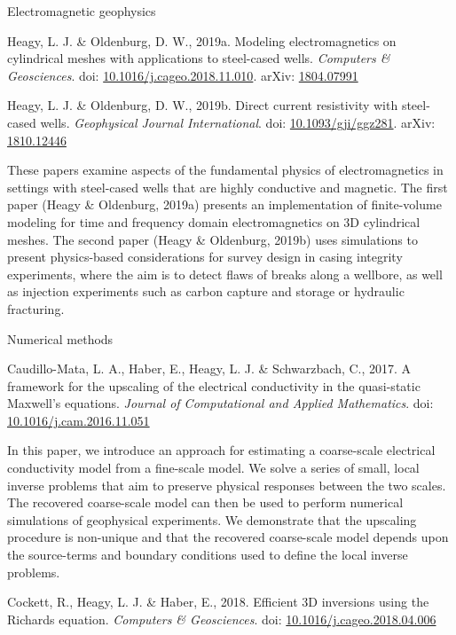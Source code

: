 \documentclass[a4paper, 11pt]{article}
\newcommand{\arxiv}[1]{arXiv: \href{https://arxiv.org/abs/#1}{#1}}
\newcommand{\doi}[1]{doi: \href{https://doi.org/#1}{#1}}
\newcommand{\subheading}[1]{
    \vspace{0.4cm}
    {\Large #1}\\
    \vspace{-0.2cm}
}
\begin{document}
\subheading{Electromagnetic geophysics}

\begin{myitemize}
    \item Heagy, L. J. \& Oldenburg, D. W., 2019a. Modeling electromagnetics on cylindrical meshes with applications to steel-cased wells. \emph{Computers \& Geosciences}. \doi{10.1016/j.cageo.2018.11.010}. \arxiv{1804.07991}
    \item Heagy, L. J. \& Oldenburg, D. W., 2019b. Direct current resistivity with steel-cased wells. \emph{Geophysical Journal International}. \doi{10.1093/gji/ggz281}. \arxiv{1810.12446}
\end{myitemize}

These papers examine aspects of the fundamental physics of electromagnetics in settings with steel-cased wells that are highly conductive and magnetic. The first paper (Heagy \& Oldenburg, 2019a) presents an implementation of finite-volume modeling for time and frequency domain electromagnetics on 3D cylindrical meshes. The second paper (Heagy \& Oldenburg, 2019b) uses simulations to present physics-based considerations for survey design in casing integrity experiments, where the aim is to detect flaws of breaks along a wellbore, as well as injection experiments such as carbon capture and storage or hydraulic fracturing.


\subheading{Numerical methods}

\begin{myitemize}
    \item Caudillo-Mata, L. A., Haber, E., Heagy, L. J. \& Schwarzbach, C., 2017. A framework for the upscaling of the electrical conductivity in the quasi-static Maxwell's equations. \emph{Journal of Computational and Applied Mathematics}. \doi{10.1016/j.cam.2016.11.051}
\end{myitemize}

In this paper, we introduce an approach for estimating a coarse-scale electrical conductivity model from a fine-scale model. We solve a series of small, local inverse problems that aim to preserve physical responses between the two scales. The recovered coarse-scale model can then be used to perform numerical simulations of geophysical experiments. We demonstrate that the upscaling procedure is non-unique and that the recovered coarse-scale model depends upon the source-terms and boundary conditions used to define the local inverse problems.
\\

\begin{myitemize}
    \item Cockett, R., Heagy, L. J. \& Haber, E., 2018. Efficient 3D inversions using the Richards equation. \emph{Computers \& Geosciences}. \doi{10.1016/j.cageo.2018.04.006}
\end{myitemize}
\end{document}
